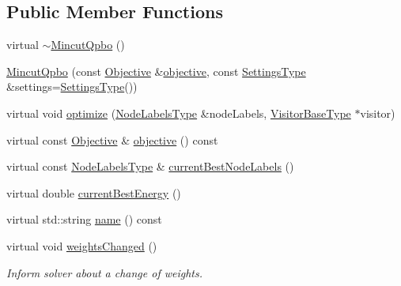 \subsection*{Public Member Functions}
\begin{DoxyCompactItemize}
\item 
virtual \hyperlink{classnifty_1_1graph_1_1optimization_1_1mincut_1_1MincutQpbo_ae78e80d76f915eadad9a51a4544037bb}{$\sim$\+Mincut\+Qpbo} ()
\item 
\hyperlink{classnifty_1_1graph_1_1optimization_1_1mincut_1_1MincutQpbo_a38620f8a5f20cf937827f2542c78ef8b}{Mincut\+Qpbo} (const \hyperlink{classnifty_1_1graph_1_1optimization_1_1mincut_1_1MincutQpbo_ad5d16b8f42da9e1330dbd9cc9b0435aa}{Objective} \&\hyperlink{classnifty_1_1graph_1_1optimization_1_1mincut_1_1MincutQpbo_a664e5b0ec41f70c578e8bc9349169a8e}{objective}, const \hyperlink{structnifty_1_1graph_1_1optimization_1_1mincut_1_1MincutQpbo_1_1SettingsType}{Settings\+Type} \&settings=\hyperlink{structnifty_1_1graph_1_1optimization_1_1mincut_1_1MincutQpbo_1_1SettingsType}{Settings\+Type}())
\item 
virtual void \hyperlink{classnifty_1_1graph_1_1optimization_1_1mincut_1_1MincutQpbo_ab4784b2f896cf1bb80de5e5d3e0b704c}{optimize} (\hyperlink{classnifty_1_1graph_1_1optimization_1_1mincut_1_1MincutQpbo_aac9ec9c574aa36724795a7596e887834}{Node\+Labels\+Type} \&node\+Labels, \hyperlink{classnifty_1_1graph_1_1optimization_1_1mincut_1_1MincutQpbo_aba6eaaa013ca021676e82152a22e7d55}{Visitor\+Base\+Type} $\ast$visitor)
\item 
virtual const \hyperlink{classnifty_1_1graph_1_1optimization_1_1mincut_1_1MincutQpbo_ad5d16b8f42da9e1330dbd9cc9b0435aa}{Objective} \& \hyperlink{classnifty_1_1graph_1_1optimization_1_1mincut_1_1MincutQpbo_a664e5b0ec41f70c578e8bc9349169a8e}{objective} () const 
\item 
virtual const \hyperlink{classnifty_1_1graph_1_1optimization_1_1mincut_1_1MincutQpbo_aac9ec9c574aa36724795a7596e887834}{Node\+Labels\+Type} \& \hyperlink{classnifty_1_1graph_1_1optimization_1_1mincut_1_1MincutQpbo_ae00cd23fca945b527996368044de6a06}{current\+Best\+Node\+Labels} ()
\item 
virtual double \hyperlink{classnifty_1_1graph_1_1optimization_1_1mincut_1_1MincutQpbo_a5eea341eb38f311cc18d1cdf9e10bfbc}{current\+Best\+Energy} ()
\item 
virtual std\+::string \hyperlink{classnifty_1_1graph_1_1optimization_1_1mincut_1_1MincutQpbo_acfb53c2d7e1841b07aa7bb3b6609528f}{name} () const 
\item 
virtual void \hyperlink{classnifty_1_1graph_1_1optimization_1_1mincut_1_1MincutQpbo_a7bf3d01da532968da9d23cc4b7955551}{weights\+Changed} ()
\begin{DoxyCompactList}\small\item\em Inform solver about a change of weights. \end{DoxyCompactList}\end{DoxyCompactItemize}


